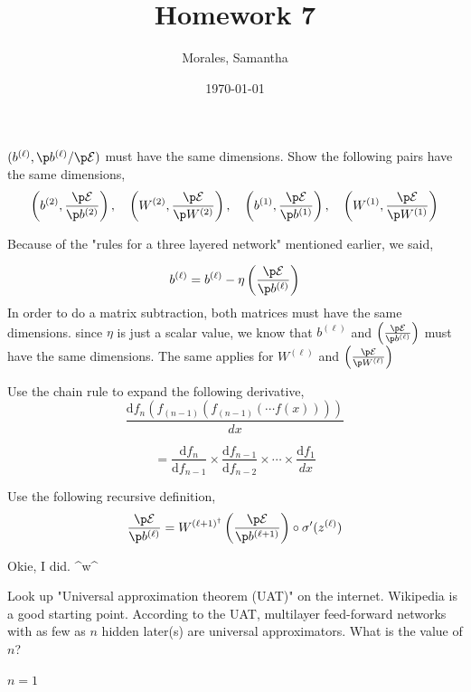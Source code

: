 \documentclass{homework}
\author{Morales, Samantha}
\date{\today}
\title{Homework 7}
\begin{document}
 \maketitle

\question $(b^{(\ell)},\p b^{(\ell)} / \p \mathcal{E})$ must have the same dimensions. Show the following pairs have the same dimensions,
\[
	\left(b^{(2)},\frac{\p \mathcal{E}}{\p b^{(2)}}\right), \quad \left(W^{(2)}, \frac{\p \mathcal{E}}{\p W^{(2)}}\right), \quad \left(b^{(1)}, \frac{\p \mathcal{E}}{\p b^{(1)}}\right), \quad \left(W^{(1)}, \frac{\p \mathcal{E}}{\p W^{(1)}}\right)
\]

\begin{sol}
	Because of the "rules for a three layered network" mentioned earlier, we said,

	\[
		b^{(\ell)} = b^{(\ell)} - \eta \left( \frac{\p \mathcal{E}}{\p b^{(\ell)}}\right)
	\]
	In order to do a matrix subtraction, both matrices must have the same dimensions. since $\eta$ is just a scalar value, we know that $b^{(\ell)}$ and $\left( \frac{\p \mathcal{E}}{\p b^{(\ell)}}\right)$ must have the same dimensions. The same applies for $W^{(\ell)}$ and $\left( \frac{\p \mathcal{E}}{\p W^{(\ell)}}\right)$ 
\end{sol}

\question Use the chain rule to expand the following derivative,
\[
	\frac{\text{d} f_n(f_{(n-1)}(f_{(n-1)}(\cdots f(x))))}{dx}
\]

\begin{sol}
\[
	= \frac{\text{d}f_n}{\text{d}f_{n-1}} \times \frac{\text{d}f_{n-1}}{\text{d}f_{n-2}} \times \cdots \times \frac{\text{d} f_1}{dx}
\]
\end{sol}

\question Use the following recursive definition,
\[
	\frac{\p\mathcal{E}}{\p b^{(\ell)}} = W^{(\ell + 1)^\dagger} \left(\frac{\p\mathcal{E}}{\p b^{(\ell + 1)}}\right) \circ \sigma' (z^{(\ell)})
\]

\begin{sol}
	Okie, I did. \textasciicircum{}w\textasciicircum{}
\end{sol}

\question Look up "Universal approximation theorem (UAT)" on the internet. Wikipedia is a good starting point. According to the UAT, multilayer feed-forward networks with as few as $n$ hidden later(s) are universal approximators. What is the value of $n$?

\begin{sol}
$n = 1$
\end{sol}
\end{document}
